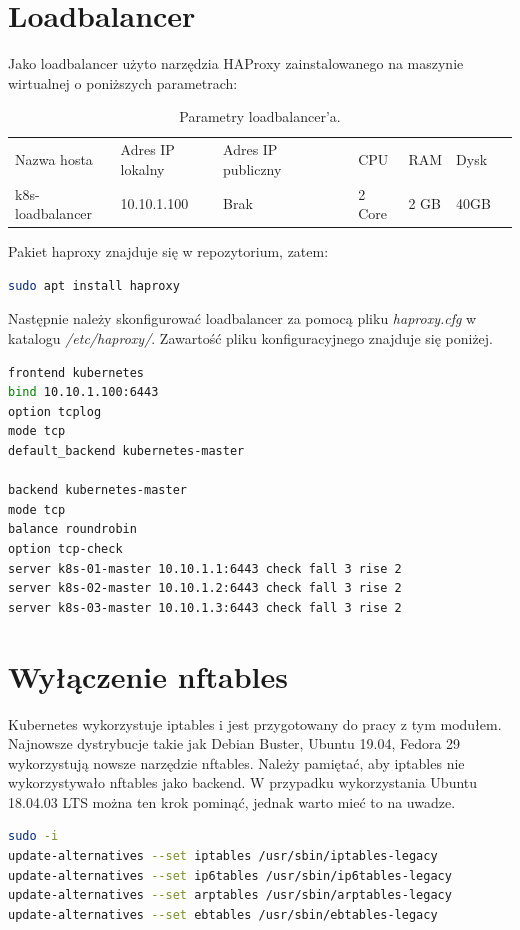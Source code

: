 \documentclass[pl,final,oneside]{mgr} %
\begin{document}
\section{Loadbalancer}
Jako loadbalancer użyto narzędzia HAProxy zainstalowanego na maszynie wirtualnej o poniższych parametrach:
\begin{table}[h!]
	\begin{tabular}{lllllllll}
		Nazwa hosta   & Adres IP lokalny & Adres IP publiczny &  &  & CPU    & RAM  & Dysk &  \\
		k8s-loadbalancer & 10.10.1.100        & Brak     &  &  & 2 Core & 2 GB & 40GB & 
	\end{tabular}
	\label{tab:kvm_lb}
	\caption{Parametry loadbalancer'a.}
\end{table}
Pakiet haproxy znajduje się w repozytorium, zatem:
\begin{lstlisting}[language=Bash]
sudo apt install haproxy
\end{lstlisting}
Następnie należy skonfigurować loadbalancer za pomocą pliku \textit{haproxy.cfg} w katalogu \textit{/etc/haproxy/}. Zawartość pliku konfiguracyjnego znajduje się poniżej.

\begin{lstlisting}[language=Bash]
frontend kubernetes
bind 10.10.1.100:6443
option tcplog
mode tcp
default_backend kubernetes-master

backend kubernetes-master
mode tcp
balance roundrobin
option tcp-check
server k8s-01-master 10.10.1.1:6443 check fall 3 rise 2
server k8s-02-master 10.10.1.2:6443 check fall 3 rise 2
server k8s-03-master 10.10.1.3:6443 check fall 3 rise 2
\end{lstlisting}


\section{Wyłączenie nftables}
Kubernetes wykorzystuje iptables i jest przygotowany do pracy z tym modułem. Najnowsze dystrybucje takie jak Debian Buster, Ubuntu 19.04, Fedora 29 wykorzystują nowsze narzędzie nftables. Należy pamiętać, aby iptables nie wykorzystywało nftables jako backend. W przypadku wykorzystania Ubuntu 18.04.03 LTS można ten krok pominąć, jednak warto mieć to na uwadze.
\begin{lstlisting}[language=Bash]
sudo -i
update-alternatives --set iptables /usr/sbin/iptables-legacy
update-alternatives --set ip6tables /usr/sbin/ip6tables-legacy
update-alternatives --set arptables /usr/sbin/arptables-legacy
update-alternatives --set ebtables /usr/sbin/ebtables-legacy
\end{lstlisting}
\end{document}
